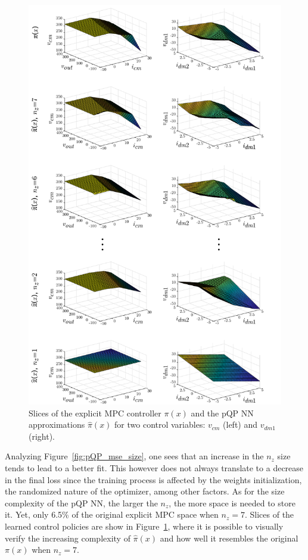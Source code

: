 \begin{figure}[!b]
	\vspace{0pt}
	\begin{center}
		\includegraphics[scale=0.65]{../images/chap4_simres_surfs.pdf}    %
		\caption{Slices of the explicit MPC controller $\pi(x)$ and the pQP NN approximations $\hat\pi(x)$ for two control variables: $v_{cm}$ (left) and $v_{dm1}$ (right).} 
		\label{fig:niceSlices}
	\end{center}
\end{figure}

Analyzing Figure~\ref{fig:pQP_mse_size}, one sees that an increase in the $n_z$ size tends to lead to a better fit. This however does not always translate to a decrease in the final loss since the training process is affected by the weights initialization, the randomized nature of the optimizer, among other factors. As for the size complexity of the pQP NN, the larger the $n_z$, the more space is needed to store it. Yet, only 6.5\% of the original explicit MPC space when $n_z=7$. Slices of the learned control policies are show in Figure~\ref{fig:niceSlices}, where it is possible to visually verify the increasing complexity of $\hat\pi(x)$ and how well it resembles the original $\pi(x)$ when $n_z = 7$.

